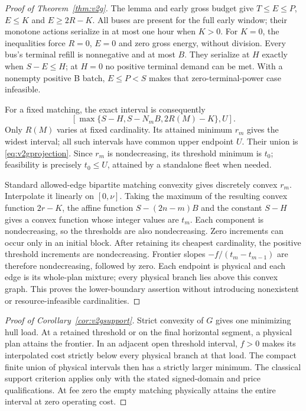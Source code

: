 \begin{proof}[Proof of Theorem~\ref{thm:v2g}]
The lemma and early gross budget give $T\le E\le P$, $E\le K$
and $E\ge2R-K$. All buses are present for the full early window;
their monotone actions serialize in at most one hour when $K>0$.
For $K=0$, the inequalities force $R=0$, $E=0$ and zero gross energy,
without division. Every bus's terminal refill is nonnegative and at most
$B$. They serialize at $H$ exactly when $S-E\le H$; at $H=0$ no
positive terminal demand can be met. With a nonempty positive B batch,
$E\le P<S$ makes that zero-terminal-power case infeasible.

For a fixed matching, the exact interval is consequently
\[
 [\max\{S-H,S-N_mB,2R(M)-K\},U].
\]
Only $R(M)$ varies at fixed cardinality. Its attained minimum $r_m$
gives the widest interval; all such intervals have common upper endpoint
$U$. Their union is \eqref{eq:v2gprojection}. Since $r_m$ is
nondecreasing, its threshold minimum is $t_0$; feasibility is precisely
$t_0\le U$, attained by a standalone fleet when needed.

Standard allowed-edge bipartite matching convexity gives discretely convex
$r_m$. Interpolate it linearly on $[0,\nu]$. Taking the maximum of
the resulting convex function $2r-K$, the affine function $S-(2n-m)B$
and the constant $S-H$ gives a convex function whose integer values are
$t_m$. Each component is nondecreasing, so the thresholds are also
nondecreasing. Zero increments can occur only in an initial block.
After retaining its cheapest cardinality, the positive threshold increments
are nondecreasing. Frontier slopes $-f/(t_m-t_{m-1})$ are therefore
nondecreasing, followed by zero. Each endpoint is physical and each edge
is its whole-plan mixture; every physical branch lies above this convex
graph. This proves the lower-boundary assertion without introducing
nonexistent or resource-infeasible cardinalities.
\end{proof}

\begin{proof}[Proof of Corollary~\ref{cor:v2gsupport}]
Strict convexity of $G$ gives one minimizing hull load. At a retained
threshold or on the final horizontal segment, a physical plan attains the
frontier. In an adjacent open threshold interval, $f>0$ makes its
interpolated cost strictly below every physical branch at that load.
The compact finite union of physical intervals then has a strictly larger
minimum. The classical support criterion applies only with the stated
signed-domain and price qualifications. At fee zero the empty matching
physically attains the entire interval at zero operating cost.
\end{proof}

